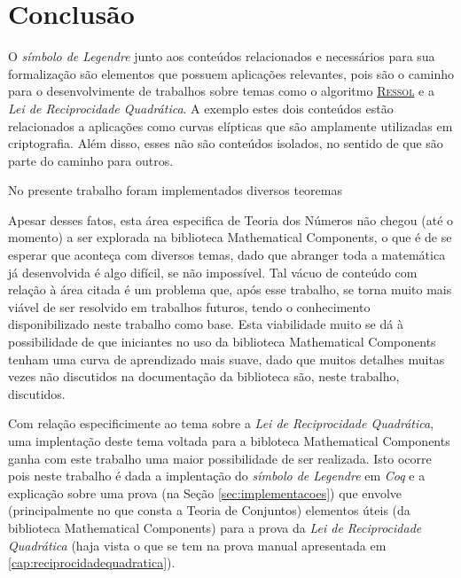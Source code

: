 \chapter{Conclusão}
\label{cap:conclusao}

O \textit{símbolo de Legendre} junto aos conteúdos relacionados e necessários para sua formalização são elementos que possuem aplicações relevantes, pois são o caminho para o desenvolvimente de trabalhos sobre temas como o algoritmo \hyperref[algo:ressol]{\textsc{Ressol}} e a \textit{Lei de Reciprocidade Quadrática}. A exemplo estes dois conteúdos estão relacionados a aplicações como curvas elípticas que são amplamente utilizadas em criptografia. Além disso, esses não são conteúdos isolados, no sentido de que são parte do caminho para outros.

    No presente trabalho foram implementados diversos teoremas 

Apesar desses fatos, esta área especifica de Teoria dos Números não chegou (até o momento) a ser explorada na biblioteca Mathematical Components, o que é de se esperar que aconteça com diversos temas, dado que abranger toda a matemática já desenvolvida é algo difícil, se não impossível. Tal vácuo de conteúdo com relação à área citada é um problema que, após esse trabalho, se torna muito mais viável de ser resolvido em trabalhos futuros, tendo o conhecimento disponibilizado neste trabalho como base. Esta viabilidade muito se dá à possibilidade de que iniciantes no uso da biblioteca Mathematical Components tenham uma curva de aprendizado mais suave, dado que muitos detalhes muitas vezes não discutidos na documentação da biblioteca são, neste trabalho, discutidos.

Com relação especificimente ao tema sobre a \textit{Lei de Reciprocidade Quadrática}, uma implentação deste tema voltada para a bibloteca Mathematical Components ganha com este trabalho uma maior possibilidade de ser realizada. Isto ocorre pois neste trabalho é dada a implentação do \textit{símbolo de Legendre} em \textit{Coq} e a explicação sobre uma prova (na Seção \ref{sec:implementacoes}) que envolve (principalmente no que consta a Teoria de Conjuntos) elementos úteis (da biblioteca Mathematical Components) para a prova da \textit{Lei de Reciprocidade Quadrática} (haja vista o que se tem na prova manual apresentada em \ref{cap:reciprocidadequadratica}).

